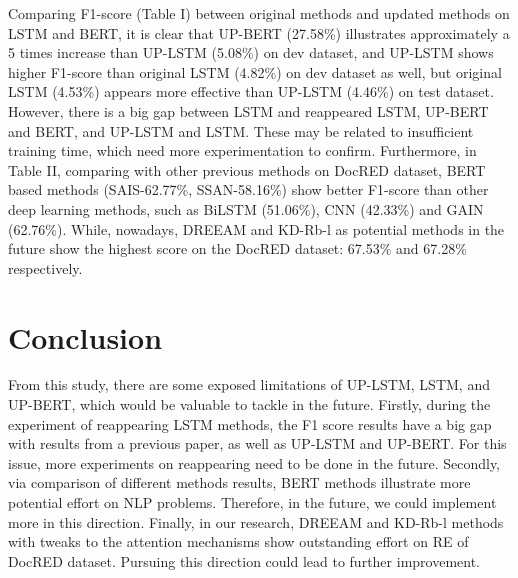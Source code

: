\documentclass[conference]{IEEEtran}
\begin{document}
Comparing F1-score (Table I) between original methods and updated methods on LSTM and BERT, it is clear that UP-BERT (27.58\%) illustrates approximately a 5 times increase than UP-LSTM (5.08\%) on dev dataset, and UP-LSTM shows higher F1-score than original LSTM (4.82\%) on dev dataset as well, but original LSTM (4.53\%) appears more effective than UP-LSTM (4.46\%) on test dataset. However, there is a big gap between LSTM and reappeared LSTM, UP-BERT and BERT, and UP-LSTM and LSTM. These may be related to insufficient training time, which need more experimentation to confirm. Furthermore, in Table II, comparing with other previous methods on DocRED dataset, BERT based methods (SAIS-62.77\%, SSAN-58.16\%) show better F1-score than other deep learning methods, such as BiLSTM (51.06\%), CNN (42.33\%) and GAIN (62.76\%). While, nowadays, DREEAM and KD-Rb-l as potential methods in the future show the highest score on the DocRED dataset: 67.53\% and 67.28\% respectively.


\section{Conclusion}

From this study, there are some exposed limitations of UP-LSTM, LSTM, and UP-BERT, which would be valuable to tackle in the future. Firstly, during the experiment of reappearing LSTM methods, the F1 score results have a big gap with results from a previous paper, as well as UP-LSTM and UP-BERT. For this issue, more experiments on reappearing need to be done in the future. Secondly, via comparison of different methods results, BERT methods illustrate more potential effort on NLP problems. Therefore, in the future, we could implement more in this direction. Finally, in our research, DREEAM\cite{ma2023dreeam} and KD-Rb-l\cite{TanQingyu2022RD-A} methods with tweaks to the attention mechanisms show outstanding effort on RE of DocRED dataset. Pursuing this direction could lead to further improvement.



\end{document}

